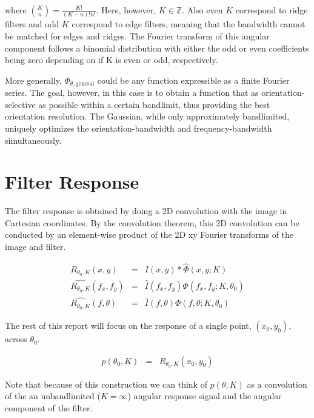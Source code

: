 \documentclass{article}
\begin{document}
where $ {K \choose n} = \frac{K!}{(K-n)!n!} $. Here, however, $ K \in \mathbb{Z} $. Also even $ K $ correspond to ridge filters and odd $ K $ correspond to edge filters, meaning that the bandwidth cannot be matched for edges and ridges. The Fourier transform of this angular component follows a binomial distribution with either the odd or even coefficients being zero depending on if K is even or odd, respectively.

More generally, $ \Phi_{\theta,\mbox{general}} $ could be any function expressible as a finite Fourier series. The goal, however, in this case is to obtain a function that as orientation-selective as possible within a certain bandlimit, thus providing the best orientation resolution. The Gaussian, while only approximately bandlimited, uniquely optimizes the orientation-bandwidth and frequency-bandwidth simultaneously.



\section{Filter Response}

The filter response is obtained by doing a 2D convolution with the image in Cartesian coordinates. By the convolution theorem, this 2D convolution can be conducted by an element-wise product of the 2D xy Fourier transforms of the image and filter.

\begin{eqnarray}
    R_{\theta_0,K}(x,y) & = & I(x,y) \ast \hat{\Phi}(x,y; K) \\
    \widehat{R_{\theta_0,K}}(f_x,f_y) & = & \hat{I}(f_x,f_y) \Phi(f_x,f_y; K, \theta_0) \\
    \widehat{R_{\theta_0,K}}(f,\theta) & = & \hat{I}(f,\theta) \Phi(f,\theta; K, \theta_0)
\end{eqnarray}

The rest of this report will focus on the response of a single point, $ (x_0,y_0) $, across $ \theta_0 $.

\begin{eqnarray}
    p(\theta_0,K) & = & R_{\theta_0,K}(x_0,y_0)
\end{eqnarray}

Note that because of this construction we can think of $ p(\theta,K) $ as a convolution of the an unbandlimited ($K = \infty $) angular response signal and the angular component of the filter.
\end{document}
